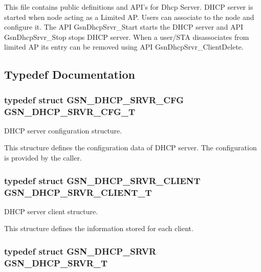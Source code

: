 \par
 This file contains public definitions and API's for Dhcp Server. DHCP server is started when node acting as a Limited AP. Users can associate to the node and configure it. The API GsnDhcpSrvr\_\-Start starts the DHCP server and API GsnDhcpSrvr\_\-Stop stops DHCP server. When a user/STA disassociates from limited AP its entry can be removed using API GsnDhcpSrvr\_\-ClientDelete. 

\subsection{Typedef Documentation}
\hypertarget{a00661_ga5a69af0df29b0dc56441470a22cf3ab3}{
\subsubsection[{GSN\_\-DHCP\_\-SRVR\_\-CFG\_\-T}]{\setlength{\rightskip}{0pt plus 5cm}typedef struct {\bf GSN\_\-DHCP\_\-SRVR\_\-CFG}  {\bf GSN\_\-DHCP\_\-SRVR\_\-CFG\_\-T}}}
\label{a00661_ga5a69af0df29b0dc56441470a22cf3ab3}


DHCP server configuration structure. 

This structure defines the configuration data of DHCP server. The configuration is provided by the caller. \hypertarget{a00661_ga54a36c901a1b4f316e5202de8b35def8}{
\subsubsection[{GSN\_\-DHCP\_\-SRVR\_\-CLIENT\_\-T}]{\setlength{\rightskip}{0pt plus 5cm}typedef struct {\bf GSN\_\-DHCP\_\-SRVR\_\-CLIENT}  {\bf GSN\_\-DHCP\_\-SRVR\_\-CLIENT\_\-T}}}
\label{a00661_ga54a36c901a1b4f316e5202de8b35def8}


DHCP server client structure. 

This structure defines the information stored for each client. \hypertarget{a00661_ga894396f4b78d0bb4bd07286f4004fe8f}{
\subsubsection[{GSN\_\-DHCP\_\-SRVR\_\-T}]{\setlength{\rightskip}{0pt plus 5cm}typedef struct {\bf GSN\_\-DHCP\_\-SRVR}  {\bf GSN\_\-DHCP\_\-SRVR\_\-T}}}
\label{a00661_ga894396f4b78d0bb4bd07286f4004fe8f}


